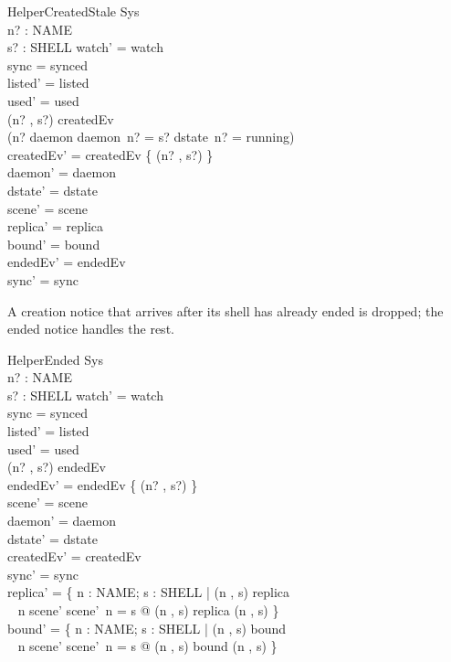 \documentclass[a4paper,10pt,fleqn]{article}
\begin{document}
\begin{schema}{HelperCreatedStale}
  \Delta Sys \\
  n? : NAME \\
  s? : SHELL
\where
  watch' = watch \\
  sync = synced \\
  listed' = listed \\
  used' = used \\
  (n? , s?) \in createdEv \\
  \lnot (n? \in \dom daemon \land daemon~n? = s?
    \land dstate~n? = running) \\
  createdEv' = createdEv \setminus \{ (n? , s?) \} \\
  daemon' = daemon \\
  dstate' = dstate \\
  scene' = scene \\
  replica' = replica \\
  bound' = bound \\
  endedEv' = endedEv \\
  sync' = sync
\end{schema}

A creation notice that arrives after its shell has already ended is
dropped; the ended notice handles the rest.

\begin{schema}{HelperEnded}
  \Delta Sys \\
  n? : NAME \\
  s? : SHELL
\where
  watch' = watch \\
  sync = synced \\
  listed' = listed \\
  used' = used \\
  (n? , s?) \in endedEv \\
  endedEv' = endedEv \setminus \{ (n? , s?) \} \\
  scene' = scene \\
  daemon' = daemon \\
  dstate' = dstate \\
  createdEv' = createdEv \\
  sync' = sync \\
  replica' = \{ n : NAME; s : SHELL | (n , s) \in \dom replica \\
    \quad~ \land n \in \dom scene' \land scene'~n = s @ (n , s) \mapsto replica (n , s) \} \\
  bound' = \{ n : NAME; s : SHELL | (n , s) \in \dom bound \\
    \quad~ \land n \in \dom scene' \land scene'~n = s @ (n , s) \mapsto bound (n , s) \}
\end{schema}
\end{document}

